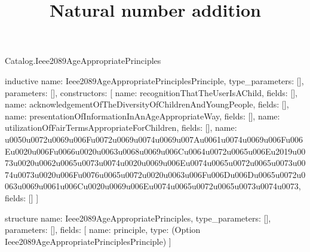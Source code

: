 \begin{lexlean}{Catalog.Ieee2089AgeAppropriatePrinciples}
\title{Natural number addition}
\begin{semanticmodule}
inductive{
  name: Ieee2089AgeAppropriatePrinciplesPrinciple,
  type_parameters: [],
  parameters: [],
  constructors: [
    {name: recognitionThatTheUserIsAChild, fields: []},
    {name: acknowledgementOfTheDiversityOfChildrenAndYoungPeople, fields: []},
    {name: presentationOfInformationInAnAgeAppropriateWay, fields: []},
    {name: utilizationOfFairTermsAppropriateForChildren, fields: []},
    {name: u0050u0072u0069u006Fu0072u0069u0074u0069u007Au0061u0074u0069u006Fu006Eu0020u006Fu0066u0020u0063u0068u0069u006Cu0064u0072u0065u006Eu2019u0073u0020u0062u0065u0073u0074u0020u0069u006Eu0074u0065u0072u0065u0073u0074u0073u0020u006Fu0076u0065u0072u0020u0063u006Fu006Du006Du0065u0072u0063u0069u0061u006Cu0020u0069u006Eu0074u0065u0072u0065u0073u0074u0073, fields: []}
  ]
}

structure{
  name: Ieee2089AgeAppropriatePrinciples,
  type_parameters: [],
  parameters: [],
  fields: [
    {name: principle, type: (Option Ieee2089AgeAppropriatePrinciplesPrinciple)}
  ]
}
\end{semanticmodule}
\end{lexlean}
